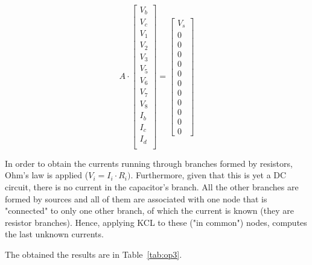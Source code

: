 \begin{equation}
    A \cdot
  \begin{bmatrix}
    V_b\\
    V_c\\
    V_1\\
    V_2\\
    V_3\\
    V_5\\
    V_6\\
    V_7\\
    V_8\\
    I_b\\
    I_c\\
    I_d\\
  \end{bmatrix}
    =
  \begin{bmatrix}
    V_s\\0\\0\\0\\0\\0\\0\\0\\0\\0\\0\\0
  \end{bmatrix}
  \label{eq:nodal_matrix_syst}
\end{equation}

In order to obtain the currents running through branches formed by resistors, Ohm's law is applied ($V_i = I_i \cdot R_i)$. Furthermore, given that this is yet a DC circuit, there is no current in the capacitor's branch. All the other branches are formed by sources and all of them are associated with one node that is "connected" to only one other branch, of which the current is known (they are resistor branches). Hence, applying KCL to these ("in common") nodes, computes the last unknown currents.

The obtained the results are in Table~\ref{tab:op3}.

\begin{comment}

\begin{table}[h]
  \centering
  \begin{tabular}{|l|r|}
    \hline    
    {\bf Name} & {\bf Value [A or V]} \\ \hline
    
  \end{tabular}
  \caption{Values for the components using the node method.}
  \label{tab:op3}
\end{table}

\end{comment}



